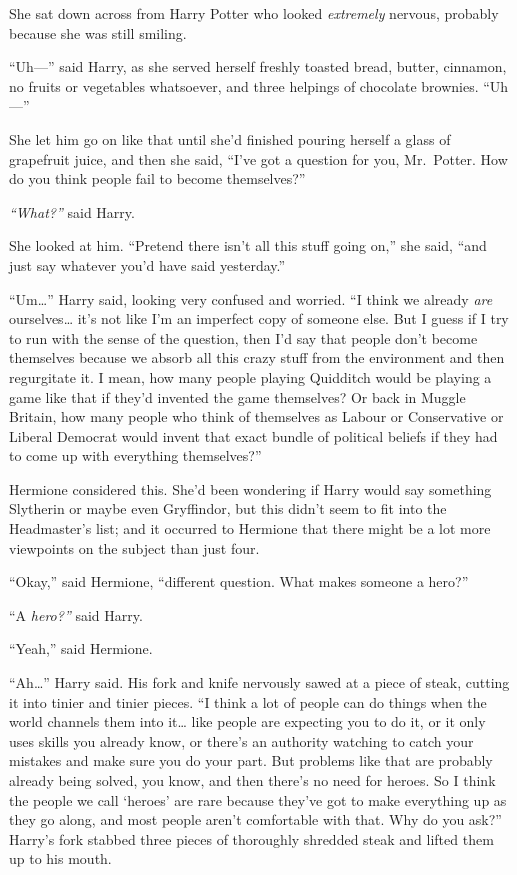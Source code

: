 She sat down across from Harry Potter who looked \emph{extremely}
nervous, probably because she was still smiling.

``Uh---'' said Harry, as she served herself freshly toasted bread,
butter, cinnamon, no fruits or vegetables whatsoever, and three helpings
of chocolate brownies. ``Uh---''

She let him go on like that until she'd finished pouring herself a glass
of grapefruit juice, and then she said, ``I've got a question for you,
Mr.~Potter. How do you think people fail to become themselves?''

\emph{``What?''} said Harry.

She looked at him. ``Pretend there isn't all this stuff going on,'' she
said, ``and just say whatever you'd have said yesterday.''

``Um\ldots{}'' Harry said, looking very confused and worried. ``I think
we already \emph{are} ourselves\ldots{} it's not like I'm an imperfect
copy of someone else. But I guess if I try to run with the sense of the
question, then I'd say that people don't become themselves because we
absorb all this crazy stuff from the environment and then regurgitate
it. I mean, how many people playing Quidditch would be playing a game
like that if they'd invented the game themselves? Or back in Muggle
Britain, how many people who think of themselves as Labour or
Conservative or Liberal Democrat would invent that exact bundle of
political beliefs if they had to come up with everything themselves?''

Hermione considered this. She'd been wondering if Harry would say
something Slytherin or maybe even Gryffindor, but this didn't seem to
fit into the Headmaster's list; and it occurred to Hermione that there
might be a lot more viewpoints on the subject than just four.

``Okay,'' said Hermione, ``different question. What makes someone a
hero?''

``A \emph{hero?''} said Harry.

``Yeah,'' said Hermione.

``Ah\ldots{}'' Harry said. His fork and knife nervously sawed at a piece
of steak, cutting it into tinier and tinier pieces. ``I think a lot of
people can do things when the world channels them into it\ldots{} like
people are expecting you to do it, or it only uses skills you already
know, or there's an authority watching to catch your mistakes and make
sure you do your part. But problems like that are probably already being
solved, you know, and then there's no need for heroes. So I think the
people we call `heroes' are rare because they've got to make everything
up as they go along, and most people aren't comfortable with that. Why
do you ask?'' Harry's fork stabbed three pieces of thoroughly shredded
steak and lifted them up to his mouth.

